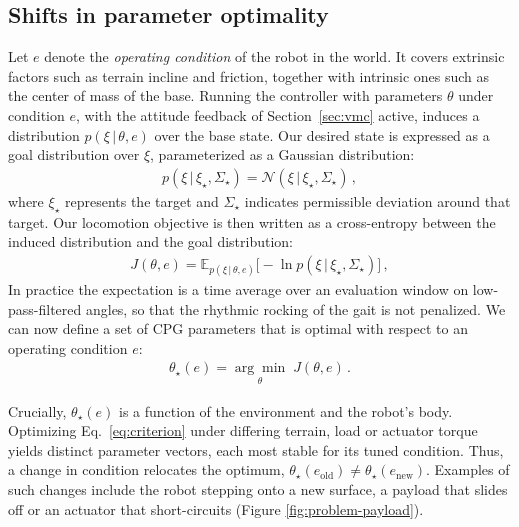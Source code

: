 \documentclass[lettersize,journal]{IEEEtran}
\newcommand{\given}[1][]{\,#1\vert\,}
\begin{document}

\subsection{Shifts in parameter optimality}
\label{sec:optimality-shift}

Let $e$ denote the \emph{operating condition} of the robot in the world.
It covers extrinsic factors such as terrain incline and friction, together with intrinsic ones such as the center of mass of the base.
Running the controller with parameters $\theta$ under condition $e$, with the attitude feedback of Section~\ref{sec:vmc} active, induces a distribution $p(\xi \given \theta, e)$ over the base state. Our desired state is expressed as a goal distribution over $\xi$, parameterized as a Gaussian distribution:
\begin{align} \label{eq:goal-prior}
	p(\xi \given \xi_{\star}, \Sigma_{\star}) = \mathcal{N}(\xi \given \xi_{\star}, \Sigma_{\star}) \, ,
\end{align}
where $\xi_{\star}$ represents the target and $\Sigma_{\star}$ indicates permissible deviation around that target. 
Our locomotion objective is then written as a cross-entropy between the induced distribution and the goal distribution:
\begin{align}
    J(\theta, e) =  \mathbb{E}_{p(\xi \given \theta, e)} \Big[ -\ln p(\xi \given \xi_{\star}, \Sigma_{\star}) \Big] \, ,
    \label{eq:criterion}
\end{align}
In practice the expectation is a time average over an evaluation window on low-pass-filtered angles, so that the rhythmic rocking of the gait is not penalized.
We can now define a set of CPG parameters that is optimal with respect to an operating condition $e$:
\begin{align}
    \theta_{\star}(e) = \underset{\theta}{\arg \min}\; J(\theta, e) \,.
    \label{eq:terrain-optimum}
\end{align}

Crucially, $\theta_{\star}(e)$ is a function of the environment and the robot's body.
Optimizing Eq.~\ref{eq:criterion} under differing terrain, load or actuator torque yields distinct parameter vectors, each most stable for its tuned condition. Thus, a change in condition relocates the optimum, $ \theta_{\star}(e_{\text{old}}) \neq \theta_{\star}(e_{\text{new}})$.
Examples of such changes include the robot stepping onto a new surface, a payload that slides off or an actuator that short-circuits (Figure \ref{fig:problem-payload}).
\end{document}
